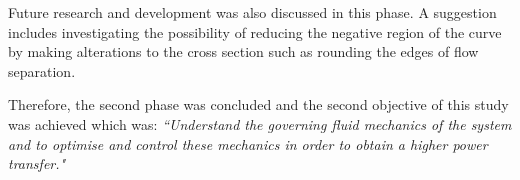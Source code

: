  Future research and development was also discussed in this phase. A suggestion includes investigating the possibility of reducing the negative region of the \cy curve by making alterations to the cross section such as rounding the edges of flow separation.
 
 Therefore, the second phase was concluded and the second objective of this study was achieved which was:\emph{ ``Understand the governing fluid mechanics of the system and to optimise and control these mechanics in order to obtain a higher power transfer."}
 
 
 
 